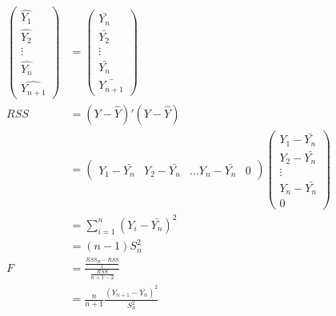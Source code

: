 \documentclass[a4paper]{article}
\begin{document}
\begin{align*}
\begin{pmatrix} 
\hat{Y_1}\\
\hat{Y_2}\\
\vdots\\
\hat{Y_n}\\
\hat{Y_{n+1}}
\end{pmatrix}&= \begin{pmatrix} 
\bar{Y_n}\\
\bar{Y_2}\\
\vdots\\
\bar{Y_n}\\
\bar{Y_{n+1}}
\end{pmatrix}\\
RSS &= (Y-\hat{Y})'(Y-\hat{Y})\\
&= \begin{pmatrix}Y_1-\bar{Y_n} & Y_2-\bar{Y_n} & \dots Y_n-\bar{Y_n}& 0 \end{pmatrix}\begin{pmatrix}Y_1-\bar{Y_n} \\ Y_2-\bar{Y_n} \\ \vdots\\ Y_n-\bar{Y_n} \\ 0 \end{pmatrix}\\
&= \sum_{i=1}^n(Y_i-\bar{Y_n})^2\\
&= (n-1)S_n^2\\
F &= \frac{\frac{RSS_H-RSS}{1}}{\frac{RSS}{n+1-2}}\\
&= \frac{n}{n+1}\frac{(Y_{n+1}-\bar{Y_n})^2}{S_n^2}
\end{align*}
\end{document}
